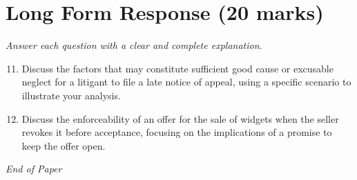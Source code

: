 \documentclass[12pt]{article}
\begin{document}
\section*{Long Form Response (20 marks)}
\textit{Answer each question with a clear and complete explanation.}
\begin{enumerate}[label=\arabic*.]
\setcounter{enumi}{10}
\item Discuss the factors that may constitute sufficient good cause or excusable neglect for a litigant to file a late notice of appeal, using a specific scenario to illustrate your analysis.
\item Discuss the enforceability of an offer for the sale of widgets when the seller revokes it before acceptance, focusing on the implications of a promise to keep the offer open.
\end{enumerate}

\vfill
\noindent\textit{End of Paper}
\end{document}
